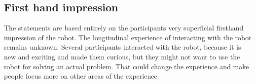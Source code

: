 \subsection{First hand impression}
The statements are based entirely on the participants very superficial firsthand impression of the robot. The longitudinal experience of interacting with the robot remains unknown. Several participants interacted with the robot, because it is new and exciting and made them curious, but they might not want to use the robot for solving an actual problem. That could change the experience and make people focus more on other areas of the experience.